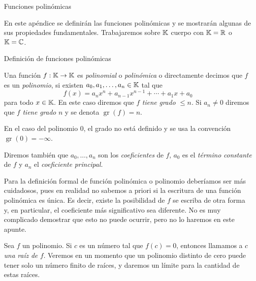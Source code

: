 \begin{chapter}{Funciones polinómicas} 

        En este apéndice se definirán las funciones polinómicas y se mostrarán algunas de sus propiedades fundamentales. Trabajaremos sobre $\mathbb K$  cuerpo con $\mathbb K=\mathbb R$ o $\mathbb K=\mathbb C$. 
        
    \begin{section}{Definición de funciones polinómicas}\label{seccion-definicion-polinomios}
            
        
        \begin{definicion}
            Una función $f: \mathbb K \to \mathbb K$ es \textit{polinomial} o \textit{polinómica} o directamente decimos que $f$  es  un \textit{polinomio}, si existen $a_0,a_1,\ldots,a_n \in \mathbb K$ tal que
            \begin{equation}\label{eq-funcion-polinomica}
                f(x) = a_nx^n + a_{n-1}x^{n-1}+\cdots + a_1x +a_0 
            \end{equation}
            para todo $x \in \mathbb K$. En este caso  diremos que  \textit{$f$ tiene grado $\le n$.} Si $a_n \ne 0$ diremos que \textit{$f$ tiene grado $n$} y  se denota $\operatorname{gr}(f)=n$.

            En  el caso del polinomio $0$, el grado no está definido y se usa la convención $\operatorname{gr}(0)=-\infty$. 
    
            Diremos también que  $a_0,\ldots,a_n$ son los \textit{coeficientes} de $f$, $a_0$ es el \textit{término constante} de $f$ y $a_n$  el \textit{coeficiente principal.} 
        \end{definicion}
        
        \begin{obs}
            Para la definición formal de función polinómica o polinomio deberíamos ser más cuidadosos, pues en realidad no sabemos a priori si la escritura de una función polinómica es única. Es  decir,  existe la posibilidad de $f$  se escriba de otra forma y,  en particular, el coeficiente más significativo sea diferente. No es muy complicado demostrar que esto no puede ocurrir, pero no lo haremos en este apunte. 
        \end{obs}
        
        
        Sea $f$ un polinomio. Si $c$ es un número tal que $f (c) = 0$, entonces llamamos a \textit{$c$ una raíz de $f$}. Veremos en un momento que un polinomio distinto de cero puede tener solo un número finito de raíces, y daremos un límite para la cantidad de estas raíces.
        

\end{section}
\end{chapter}
